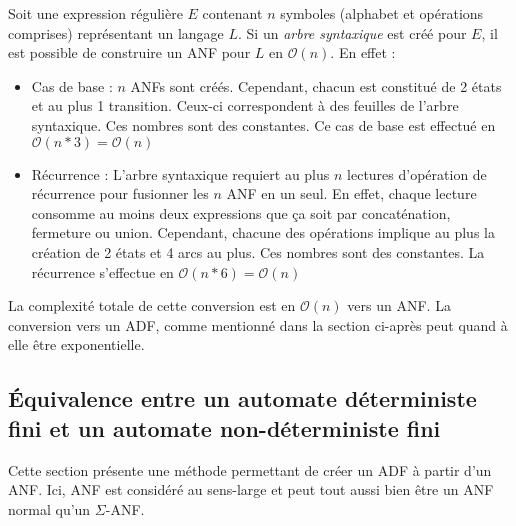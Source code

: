 \begin{complexity}
	Soit une expression régulière $E$ contenant $n$ symboles (alphabet et opérations comprises) représentant un langage $L$. Si un \emph{arbre syntaxique} est créé pour $E$, il est possible de construire un ANF pour $L$ en $\mathcal{O}(n)$. En effet :
	\begin{itemize}
		\item Cas de base : $n$ ANFs sont créés. Cependant, chacun est constitué de 2 états et au plus 1 transition. Ceux-ci correspondent à des feuilles de l'arbre syntaxique. Ces nombres sont des constantes. Ce cas de base est effectué en $\mathcal{O}(n*3)=\mathcal{O}(n)$
		\item Récurrence : L'arbre syntaxique requiert au plus $n$ lectures d'opération de récurrence pour fusionner les $n$ ANF en un seul. En effet, chaque lecture consomme au moins deux expressions que ça soit par concaténation, fermeture ou union.
    Cependant, chacune des opérations implique au plus la création de 2 états et 4 arcs au plus. Ces nombres sont des constantes. La récurrence s'effectue en $\mathcal{O}(n*6)=\mathcal{O}(n)$
	\end{itemize}

	La complexité totale de cette conversion est en $\mathcal{O}(n)$ vers un ANF. La conversion vers un ADF, comme mentionné dans la section ci-après peut quand à elle être exponentielle.

\end{complexity}




\subsection{Équivalence entre un automate déterministe fini et un automate non-déterministe fini}\label{ss:eqadfanf}
Cette section présente une méthode permettant de créer un ADF à partir d'un ANF. Ici, ANF est considéré au sens-large et peut tout aussi bien être un ANF normal qu'un $\Sigma$-ANF.

